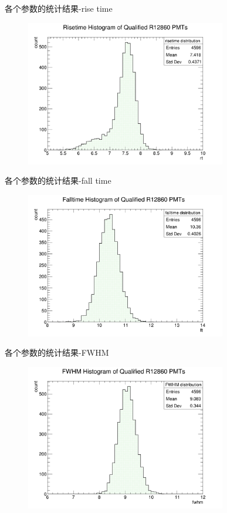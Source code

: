 \documentclass[11pt,compress,xcolor=x11names,UTF8]{beamer}
\begin{document}
\begin{frame}{各个参数的统计结果-rise time}
\begin{figure}
\centering
\includegraphics[width=0.78\textwidth]{figures/rt.png}
\end{figure}
\end{frame}
\begin{frame}{各个参数的统计结果-fall time}
\begin{figure}
\centering
\includegraphics[width=0.78\textwidth]{figures/ft.png}
\end{figure}
\end{frame}
\begin{frame}{各个参数的统计结果-FWHM}
\begin{figure}
\centering
\includegraphics[width=0.78\textwidth]{figures/fwhm.png}
\end{figure}
\end{frame}
\end{document}

